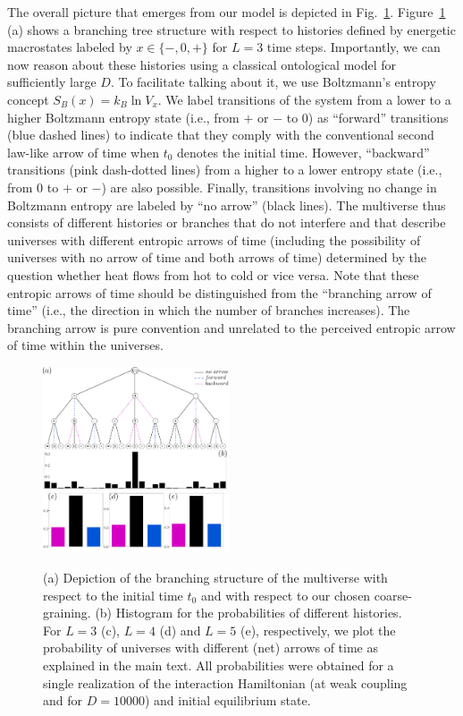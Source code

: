 \documentclass[pre,onecolumn,12pt,aps,longbibliography,nofootinbib]{revtex4-2}
\newcommand{\blue}[1]{#1}
\begin{document}
The overall picture that emerges from our model is depicted in Fig.~\ref{fig tree}. Figure~\ref{fig tree} (a) shows a branching tree structure with respect to histories defined by energetic macrostates labeled by $x\in\{-,0,+\}$ for $L=3$ time steps. Importantly, we can now reason about these histories using a {classical} ontological model for sufficiently large $D$. To facilitate talking about it, we use Boltzmann's entropy concept $S_B(x) = k_B\ln V_x$. We label transitions of the system from a lower to a higher Boltzmann entropy state (i.e., from $+$ or $-$ to $0$) as ``forward'' transitions (blue dashed lines) to indicate that they comply with the conventional \blue{second law-like} arrow of time when $t_0$ denotes the initial time. However, ``backward'' transitions (pink dash-dotted lines) from a higher to a lower entropy state (i.e., from $0$ to $+$ or $-$) are also possible. Finally, transitions involving no change in Boltzmann entropy are labeled by ``no arrow'' (black lines). The multiverse thus consists of different histories or branches that do not interfere and that describe universes with different \blue{entropic} arrows of time (including the possibility of universes with no arrow of time and both arrows of time) determined by the question whether heat flows from hot to cold or vice versa. \blue{Note that these entropic arrows of time should be distinguished from the ``branching arrow of time'' (i.e., the direction in which the number of branches increases). The branching arrow is pure convention and unrelated to the perceived entropic arrow of time within the universes.}

\begin{figure}[t]
 \centering\includegraphics[width=0.49\textwidth,clip=true]{tree2.pdf}
 \label{fig tree}
 \caption{(a) Depiction of the branching structure of the multiverse with respect to the initial time $t_0$ and with respect to our chosen coarse-graining. (b) Histogram for the probabilities of different histories. For $L=3$ (c), $L=4$ (d) and $L=5$ (e), respectively, we plot the probability of universes with different (net) arrows of time as explained in the main text. All probabilities were obtained for a single realization of the interaction Hamiltonian (at weak coupling and for $D=10000$) and initial equilibrium state. }
\end{figure}
\end{document}

